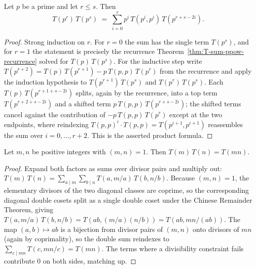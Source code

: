 \begin{theorem}\label{thm:T-sum-ppow-mul}
\leanok
Let $p$ be a prime and let $r\le s$. Then
\[
  T(p^r)\,T(p^s) \;=\; \sum_{i=0}^{r} p^i\,T(p^i,p^i)\,T(p^{r+s-2i}).
\]
\end{theorem}

\begin{proof}
\leanok
Strong induction on $r$. For $r=0$ the sum has the single term $T(p^s)$, and for $r=1$ the
statement is precisely the recurrence Theorem~\ref{thm:T-sum-ppow-recurrence} solved for
$T(p)\,T(p^s)$. For the inductive step write $T(p^{r+2})=T(p)\,T(p^{r+1})-p\,T(p,p)\,T(p^r)$ from
the recurrence and apply the induction hypothesis to $T(p^{r+1})\,T(p^s)$ and $T(p^r)\,T(p^s)$.
Each $T(p)\,T(p^{r+1+s-2i})$ splits, again by the recurrence, into a top term
$T(p^{r+2+s-2i})$ and a shifted term $p\,T(p,p)\,T(p^{r+s-2i})$; the shifted terms cancel against
the contribution of $-p\,T(p,p)\,T(p^r)$ except at the two endpoints, where reindexing
$T(p,p)^{i}\cdot T(p,p)=T(p^{i+1},p^{i+1})$ reassembles the sum over $i=0,\dots,r+2$. This is the
asserted product formula.
\end{proof}

\begin{theorem}\label{thm:T-sum-mul-coprime}
\leanok
Let $m,n$ be positive integers with $(m,n)=1$. Then $T(m)\,T(n)=T(mn)$.
\end{theorem}

\begin{proof}
\leanok
Expand both factors as sums over divisor pairs and multiply out:
$T(m)\,T(n)=\sum_{a\mid m}\sum_{b\mid n} T(a,m/a)\,T(b,n/b)$. Because $(m,n)=1$, the elementary
divisors of the two diagonal classes are coprime, so the corresponding diagonal double cosets
split as a single double coset under the Chinese Remainder Theorem, giving
$T(a,m/a)\,T(b,n/b)=T(ab,(m/a)(n/b))=T(ab,mn/(ab))$. The map $(a,b)\mapsto ab$ is a bijection from
divisor pairs of $(m,n)$ onto divisors of $mn$ (again by coprimality), so the double sum
reindexes to $\sum_{c\mid mn} T(c,mn/c)=T(mn)$. The terms where a divisibility constraint fails
contribute $0$ on both sides, matching up.
\end{proof}

